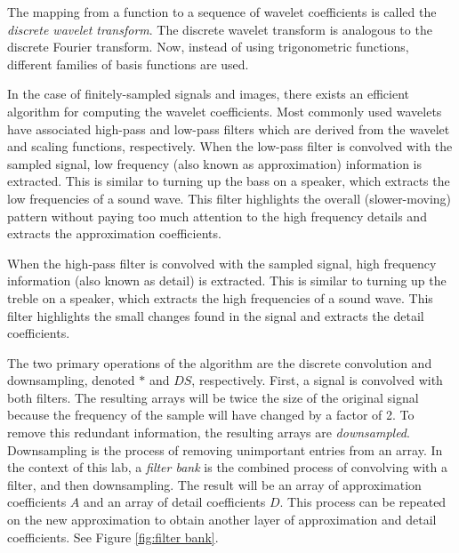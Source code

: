 The mapping from a function to a sequence of wavelet coefficients is called the \emph{discrete wavelet transform}.
The discrete wavelet transform is analogous to the discrete Fourier transform.
Now, instead of using trigonometric functions, different families of basis functions are used.


\begin{comment}
In the case of finitely-sampled signals and images, only finitely many wavelet coefficients are nonzero.
Depending on the application, we are often only interested in the coefficients corresponding to a subset of the basis functions.
Since a given family of wavelets forms an orthogonal set, we can compute the wavelet coefficients
by taking inner products (i.e. by integrating). This direct approach is not particularly efficient,
however. Just as there are fast algorithms for computing the Fourier transform (e.g. the FFT),
we can efficiently calculate wavelet coefficients using techniques from signal processing.
In particular, we will use an \emph{iterative filter bank} to compute the transform.
\end{comment}

In the case of finitely-sampled signals and images, there exists an efficient algorithm for computing the wavelet coefficients.
Most commonly used wavelets have associated high-pass and low-pass filters which are derived from the wavelet and scaling functions, respectively.
When the low-pass filter is convolved with the sampled signal, low frequency (also known as approximation) information is extracted.
This is similar to turning up the bass on a speaker, which extracts the low frequencies of a sound wave.
This filter highlights the overall (slower-moving) pattern without paying too much attention to the high frequency details and extracts the approximation coefficients.%

When the high-pass filter is convolved with the sampled signal, high frequency information (also known as detail) is extracted.
This is similar to turning up the treble on a speaker, which extracts the high frequencies of a sound wave.
This filter highlights the small changes found in the signal and extracts the detail coefficients.

The two primary operations of the algorithm are the discrete convolution and downsampling, denoted $*$ and $DS$, respectively.
First, a signal is convolved with both filters.
The resulting arrays will be twice the size of the original signal because the frequency of the sample will have changed by a factor of 2.
To remove this redundant information, the resulting arrays are \emph{downsampled}.
Downsampling is the process of removing unimportant entries from an array.
In the context of this lab, a \emph{filter bank} is the combined process of convolving with a filter, and then downsampling.
The result will be an array of approximation coefficients $A$ and an array of detail coefficients $D$.
This process can be repeated on the new approximation to obtain another layer of approximation and detail coefficients.
See Figure \ref{fig:filter bank}.

